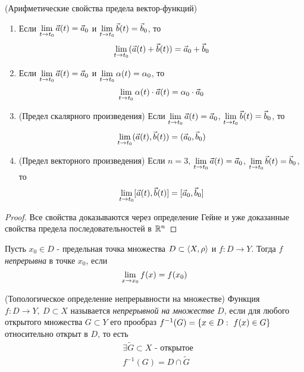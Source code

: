 \begin{theorem} (Арифметические свойства предела вектор-функций)
	\begin{enumerate}
		\item Если $\lim\limits_{t \to t_0} \vec{a}(t) = \vec{a}_0$ и $\lim\limits_{t \to t_0} \vec{b}(t) = \vec{b}_0$, то
		\[
			\lim\limits_{t \to t_0} (\vec{a}(t) + \vec{b}(t)) = \vec{a}_0 + \vec{b}_0
		\]
		
		\item Если $\lim\limits_{t \to t_0} \vec{a}(t) = \vec{a}_0$ и $\lim\limits_{t \to t_0} \alpha(t) = \alpha_0$, то
		\[
			\lim\limits_{t \to t_0} \alpha(t) \cdot \vec{a}(t) = \alpha_0 \cdot \vec{a}_0
		\]
		
		\item (Предел скалярного произведения) Если $\lim\limits_{t \to t_0} \vec{a}(t) = \vec{a}_0$, $\lim\limits_{t \to t_0} \vec{b}(t) = \vec{b}_0$, то
		\[
		\lim\limits_{t \to t_0} (\vec{a}(t), \vec{b}(t)) = (\vec{a}_0, \vec{b}_0)
		\]
		
		\item (Предел векторного произведения) Если $n = 3$, $\lim\limits_{t \to t_0} \vec{a}(t) = \vec{a}_0$, $\lim\limits_{t \to t_0} \vec{b}(t) = \vec{b}_0$, то
		\[
		\lim\limits_{t \to t_0} [\vec{a}(t), \vec{b}(t)] = [\vec{a}_0, \vec{b}_0]
		\]
	\end{enumerate}
\end{theorem}

\begin{proof}
	Все свойства доказываются через определение Гейне и уже доказанные свойства предела последовательностей в $\mathbb{R}^n$
\end{proof}

\begin{definition}
	Пусть $x_0 \in D$ - предельная точка множества $D \subset \left\langle X, \rho\right\rangle$ и $f: D \to Y$. Тогда $f$ \textit{непрерывна} в точке $x_0$, если
	\[
		\lim\limits_{x \to x_0} f(x) = f(x_0)
	\]
\end{definition}

\begin{definition} (Топологическое определение непрерывности на множестве)
	Функция $f: D \to Y,\ D \subset X$ называется \textit{непрерывной на множестве} $D$, если для любого открытого множества $G \subset Y$ его прообраз $f^{-1}(G) = \{x \in D :\  f(x) \in G\}$ относительно открыт в $D$, то есть
	\begin{align*}
		&{\exists \widetilde{G} \subset X \text{ - открытое}}
		\\
		&{f^{-1}(G) = D \cap \widetilde{G}}
	\end{align*}
\end{definition}

